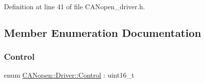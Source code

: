 Definition at line 41 of file C\+A\+Nopen\+\_\+driver.\+h.



\subsection{Member Enumeration Documentation}
\mbox{\label{class_c_a_nopen_1_1_driver_af4031601d8ef94250316995e8339903a}} 
\subsubsection{\texorpdfstring{Control}{Control}}
{\footnotesize\ttfamily enum \hyperlink{class_c_a_nopen_1_1_driver_af4031601d8ef94250316995e8339903a}{C\+A\+Nopen\+::\+Driver\+::\+Control} \+: uint16\+\_\+t}

